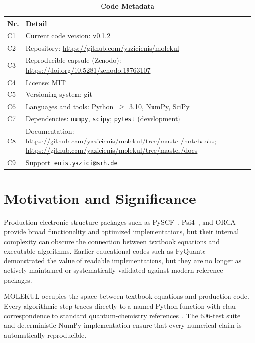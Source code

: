 \documentclass[1p,times]{elsarticle}
\begin{document}
\begin{table}[H]
\caption{\textbf{Code Metadata}}
\label{tab:metadata}
\begin{tabularx}{\columnwidth}{lX}
\toprule
\textbf{Nr.} & \textbf{Detail} \\
\midrule
C1 & Current code version: v0.1.2 \\
C2 & Repository: \url{https://github.com/yazicienis/molekul} \\
C3 & Reproducible capsule (Zenodo): \url{https://doi.org/10.5281/zenodo.19763107} \\
C4 & License: MIT \\
C5 & Versioning system: git \\
C6 & Languages and tools: Python~$\ge$~3.10, NumPy, SciPy \\
C7 & Dependencies: \texttt{numpy}, \texttt{scipy}; \texttt{pytest} (development) \\
C8 & Documentation: \url{https://github.com/yazicienis/molekul/tree/master/notebooks}; \url{https://github.com/yazicienis/molekul/tree/master/docs} \\
C9 & Support: \texttt{enis.yazici@srh.de} \\
\bottomrule
\end{tabularx}
\end{table}

\section{Motivation and Significance}

Production electronic-structure packages such as PySCF~\cite{sun2020},
Psi4~\cite{smith2020}, and ORCA~\cite{neese2020} provide broad functionality
and optimized implementations, but their internal complexity can obscure the
connection between textbook equations and executable algorithms.
Earlier educational codes such as PyQuante~\cite{quante2004} demonstrated the
value of readable implementations, but they are no longer as actively maintained
or systematically validated against modern reference packages.

MOLEKUL occupies the space between textbook equations and production code.
Every algorithmic step traces directly to a named Python function with clear
correspondence to standard quantum-chemistry
references~\cite{szabo1989,helgaker2000}.
The 606-test suite and deterministic NumPy implementation ensure that every
numerical claim is automatically reproducible.
\end{document}
